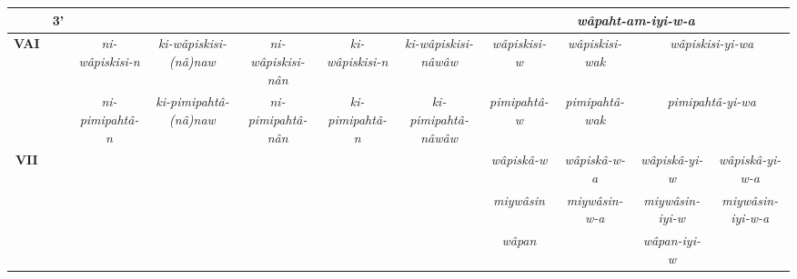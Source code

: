\documentclass[twoside,a4paper,11pt]{article}
\newcommand{\ipa}[1]{{\phon\textit{#1}}}
\newcommand{\grise}[1]{\cellcolor{lightgray}\textbf{#1}}
\newcommand{\Σ}{\greek{Σ}}
\begin{document}
\begin{table}[H]
{\begin{tabular}{ccccccccccc}
& 3'  &\grise{}  & \grise{}  & \grise{}  &\grise{}  &  \grise{}  &\multicolumn{4}{c}{\ipa{wâpaht-am-iyi-w-a} }\\ 
\bottomrule
\multirow{2}{*}{\textbf{VAI}} &  & \ipa{ni-wâpiskisi-n} & \ipa{ ki-wâpiskisi-(nâ)naw} & \ipa{ni-wâpiskisi-nân} &\ipa{ki-wâpiskisi-n} &\ipa{ ki-wâpiskisi-nâwâw} & \ipa{wâpiskisi-w} & \ipa{wâpiskisi-wak} & \multicolumn{2}{c}{\ipa{wâpiskisi-yi-wa}} \\
&  & \ipa{ni-pimipahtâ-n} & \ipa{ ki-pimipahtâ-(nâ)naw} & \ipa{ni-pimipahtâ-nân} &\ipa{ki-pimipahtâ-n} &\ipa{ ki-pimipahtâ-nâwâw} & \ipa{pimipahtâ-w} & \ipa{pimipahtâ-wak} & \multicolumn{2}{c}{\ipa{pimipahtâ-yi-wa}} \\
\bottomrule
\multirow{2}{*}{\textbf{VII}} &  &  \grise{}  &  \grise{}  &  \grise{} & \grise{}  & \grise{}  & \ipa{wâpiskâ-w} & \ipa{wâpiskâ-w-a} & \ipa{wâpiskâ-yi-w} & \ipa{wâpiskâ-yi-w-a}\\
  & &  \grise{}  &  \grise{}  &  \grise{} & \grise{}  & \grise{}  & \ipa{miywâsin} & \ipa{miywâsin-w-a} & \ipa{miywâsin-iyi-w} & \ipa{miywâsin-iyi-w-a}\\
 & &  \grise{}  &  \grise{}  &  \grise{} & \grise{}  & \grise{}  & \ipa{wâpan} &\grise{} & \ipa{wâpan-iyi-w} & \grise{}\\
\bottomrule
\end{tabular}

}
\end{table}
\end{document}
